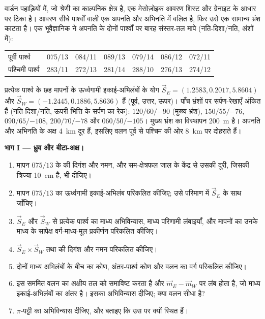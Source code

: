 \begin{problem}
\label{pb:b3:structural-analysis:1}
वार्डन पहाड़ियों में, जो श्रेणी का काल्पनिक क्षेत्र है, एक मेसोज़ोइक आवरण
शिस्ट और ग्रेनाइट के आधार पर टिका है। आवरण सीधे पार्श्वों वाली एक अपनति
और अभिनति में वलित है, फिर उसे एक सामान्य भ्रंश काटता है।
एक भूवैज्ञानिक ने अपनति के दोनों पार्श्वों पर बारह संस्तर-तल मापे
(नति-दिशा/नति, अंशों में):

\begin{center}
\small
\begin{tabular}{l|cccccc}
\hline
पूर्वी पार्श्व & 075/13 & 084/11 & 089/13 & 079/14 & 086/12 & 072/11 \\
पश्चिमी पार्श्व & 283/11 & 272/13 & 281/14 & 288/10 & 276/13 & 274/12 \\
\hline
\end{tabular}
\end{center}

प्रत्येक पार्श्व के छह मापनों के ऊर्ध्वगामी इकाई-अभिलंबों के योग
$\vec S_E = (1.2583, 0.2017, 5.8604)$ और $\vec S_W = (-1.2445, 0.1886,
5.8636)$ हैं (पूर्व, उत्तर, ऊपर)। पाँच भ्रंशों पर सर्पण-रेखाएँ अंकित हैं
(नति-दिशा/नति, ऊपरी भित्ति के सर्पण का रेक): $120/60/{-90}$ (मुख्य भ्रंश), $150/55/{-76}$,
$090/65/{-108}$, $200/70/{-78}$ और $060/50/{-105}$। मुख्य भ्रंश का
विस्थापन \qty{200}{m} है। अपनति और अभिनति के अक्ष \qty{4}{km} दूर हैं,
इसलिए वलन पूर्व से पश्चिम की ओर \qty{8}{km} पर दोहराते हैं।

\medskip\noindent\textbf{भाग I --- ध्रुव और बीटा-अक्ष।}
\begin{enumerate}
  \item मापन $075/13$ के  की दिगंश और नमन, और
        सम-क्षेत्रफल जाल के केंद्र से उसकी दूरी, जिसकी त्रिज्या
        \qty{10}{cm} है, भी दीजिए।
  \item मापन $075/13$ का ऊर्ध्वगामी इकाई-अभिलंब परिकलित कीजिए; उसे
        परिमाण में $\vec S_E$ के साथ जाँचिए।
  \item $\vec S_E$ और $\vec S_W$ से प्रत्येक पार्श्व का माध्य अभिविन्यास,
        माध्य परिणामी लंबाइयाँ, और मापनों का
        उनके माध्य के सापेक्ष वर्ग-माध्य-मूल प्रकीर्णन परिकलित कीजिए।
  \item $\vec S_E\times\vec S_W$ तथा  की दिगंश और नमन
        परिकलित कीजिए।
  \item दोनों माध्य अभिलंबों के बीच का कोण, अंतर-पार्श्व कोण
        और वलन का वर्ग परिकलित कीजिए।
  \item इस सममित वलन का अक्षीय तल  को समाविष्ट करता है और
        $\vec m_E - \vec m_W$ पर लंब होता है, जो माध्य इकाई-अभिलंबों का अंतर है।
        इसका अभिविन्यास दीजिए; क्या वलन सीधा है?
  \item $\pi$-पट्टी का अभिविन्यास दीजिए, और बताइए कि  उस पर
        क्यों स्थित हैं।
\end{enumerate}


\end{problem}
